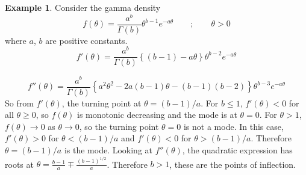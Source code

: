 \documentclass[lecture,12pt,]{pcms-l}
\numberwithin{section}{chapter}
\numberwithin{equation}{chapter}
\theoremstyle{plain}
\theoremstyle{definition}
\newtheorem{example}{Example}[section]
\theoremstyle{definition}
\begin{document}
\begin{example}
Consider the gamma density
\begin{equation}
f(\theta)=\frac{a^b}{\Gamma(b)}\theta^{b-1}e^{-a \theta}\qquad;\qquad \theta>0
\end{equation}
where $a$, $b$ are positive constants.
\begin{equation}
f'(\theta)=\frac{a^b}{\Gamma(b)}\left \{ (b-1) -a \theta  \right \}\theta^{b-2}e^{-a \theta}
\end{equation}

\begin{equation}
f''(\theta)=\frac{a^b}{\Gamma(b)}\left \{a^2 \theta^2 - 2a (b-1)\theta -(b-1)(b-2) \right \}\theta^{b-3}e^{-a \theta}
\end{equation}
So from $f'(\theta)$, the turning point at $\theta=(b-1)/a$. For $b \leq 1$, $f'(\theta)<0$ for all $\theta \geq 0$, so $f(\theta)$ is monotonic decreasing and the mode is at $\theta=0$. For $\theta>1$, $f(\theta) \rightarrow 0$ as $\theta \rightarrow 0$, so the turning point $\theta=0$ is not a mode. In this case, $f'(\theta)>0$ for $\theta < (b-1)/a$ and $f'(\theta)<0$ for  $\theta > (b-1)/a$. Therefore $\theta = (b-1)/a$ is the mode. Looking at $f''(\theta)$, the quadratic expression has roots at $\theta = \frac{b-1}{a}\mp \frac{(b-1)^{1/2}}{a}$. Therefore $b>1$, these are the points of inflection.
\end{example}
\end{document}

